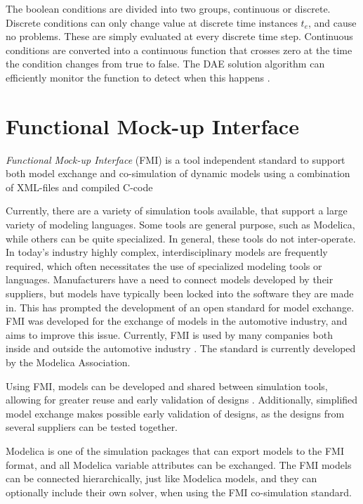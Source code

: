 \documentclass[\rootfolder/main.tex]{subfiles}
\begin{document}
The boolean conditions are divided into two groups, continuous or discrete.
Discrete conditions can only change value at discrete time instances $t_{e}$, and cause no problems.
These are simply evaluated at every discrete time step.
Continuous conditions are converted into a continuous function that crosses zero at the time the condition changes from true to false.
The DAE solution algorithm can efficiently monitor the function to detect when this happens \cite{openmodelica.org:lundvall:sims:2005}.

\section{Functional Mock-up Interface}

\begin{displayquote} \emph{Functional Mock-up Interface} (FMI) is a tool independent standard to support both model exchange and co-simulation of dynamic models using a combination of XML-files and compiled C-code
\end{displayquote}

Currently, there are a variety of simulation tools available, that support a large variety of modeling languages.
Some tools are general purpose, such as Modelica, while others can be quite specialized.
In general, these tools do not inter-operate.
In today's industry highly complex, interdisciplinary models are frequently required, which often necessitates the use of specialized modeling tools or languages.
Manufacturers have a need to connect models developed by their suppliers, but models have typically been locked into the software they are made in.  This has prompted the development of an open standard for model exchange.
FMI was developed for the exchange of models in the automotive industry, and aims to improve this issue.
Currently, FMI is used by many companies both inside and outside the automotive industry \cite{fmispecification}.
The standard is currently developed by the Modelica Association.

Using FMI, models can be developed and shared between simulation tools, allowing for greater reuse and early validation of designs \cite{Blochwitz2011}.
Additionally, simplified model exchange makes possible early validation of designs, as the designs from several suppliers can be tested together.

Modelica is one of the simulation packages that can export models to the FMI format, and all Modelica variable attributes can be exchanged.
The FMI models can be connected hierarchically, just like Modelica models, and they can optionally include their own solver, when using the FMI co-simulation standard.
\end{document}
